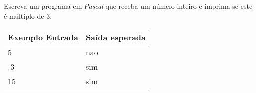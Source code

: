 \item Escreva um programa em \emph{Pascal} que receba um número inteiro e imprima se este é múltiplo de 3.

\begin{center}
\begin{tabular}{|l|l|} \hline
Exemplo Entrada & Saída esperada \\ \hline
5                & nao               \\ \hline
-3                & sim               \\ \hline
15                & sim               \\ \hline
\end{tabular}
\end{center}